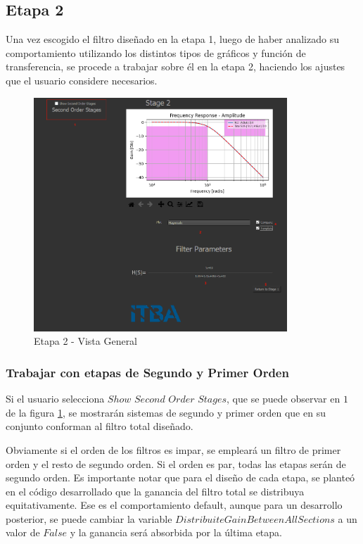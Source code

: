 \subsection{Etapa 2}

Una vez escogido el filtro diseñado en la etapa 1, luego de haber analizado su comportamiento utilizando los distintos
tipos de gráficos y función de transferencia, se procede a trabajar sobre él en la etapa 2, haciendo los ajustes que el usuario considere necesarios.

\begin{figure}[H]
    \centering
    \includegraphics[width=0.85\textwidth]{../Ejercicio1-FilterTool/Imagenes/con-plantilla.png}
    \caption{Etapa 2 - Vista General}
    \label{Etapa2}
\end{figure}

\subsubsection{Trabajar con etapas de Segundo y Primer Orden}

Si el usuario selecciona $Show$ $Second$ $Order$ $Stages$, que se puede observar en $1$
de la figura \ref{Etapa2}, se mostrarán sistemas de segundo y primer orden que en su conjunto
conforman al filtro total diseñado.

Obviamente si el orden de los filtros es impar, se empleará un filtro de primer orden y el resto de segundo orden.
Si el orden es par, todas las etapas serán de segundo orden. Es importante notar que para el diseño de cada etapa,
se planteó en el código desarrollado que la ganancia del filtro total se distribuya equitativamente. Ese es el comportamiento default, aunque para un desarrollo posterior,
se puede cambiar la variable $DistribuiteGainBetweenAllSections$ a un valor de $False$ y la ganancia será absorbida por la última etapa.

